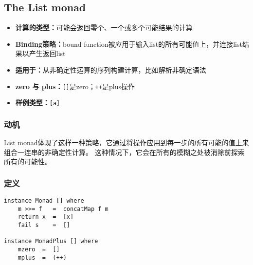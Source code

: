 \subsection{The List monad}
\begin{itemize}[leftmargin=*,topsep=0pt,itemsep=0pt]
\item \textbf{计算的类型：}可能会返回零个、一个或多个可能结果的计算
\item \textbf{Binding策略：}bound function被应用于输入list的所有可能值上，并连接list结果以产生返回list
\item \textbf{适用于：}从非确定性运算的序列构建计算，比如解析非确定语法
\item \textbf{zero 与 plus：}\texttt{[]}是zero；\texttt{++}是plus操作
\item \textbf{样例类型：}\texttt{[a]}
\end{itemize}

\vspace{-0.5em}
\subsubsection{动机}
\vspace{-0.5em}
\indent{}List monad体现了这样一种策略，它通过将操作应用到每一步的所有可能的值上来组合一连串的非确定性计算。
这种情况下，它会在所有的模糊之处被消除前探索所有的可能性。

\vspace{-0.5em}
\subsubsection{定义}
\vspace{-1.5em}
\begin{verbatim}
instance Monad [] where
    m >>= f   =  concatMap f m
    return x  =  [x]
    fail s    =  []

instance MonadPlus [] where
    mzero  =  []
    mplus  =  (++)
\end{verbatim}

\vspace{-1em}
